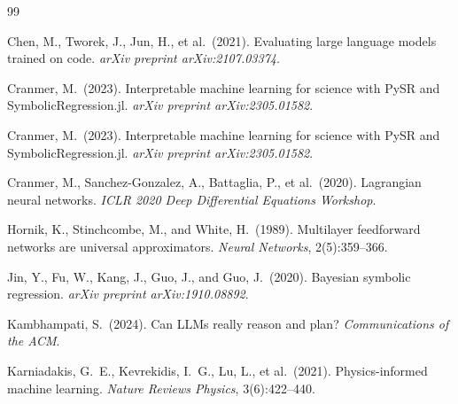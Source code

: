 \documentclass[twoside,11pt]{article}
\begin{document}

\begin{thebibliography}{99}

Chen, M., Tworek, J., Jun, H., et al.\ (2021).
Evaluating large language models trained on code.
\emph{arXiv preprint arXiv:2107.03374}.

Cranmer, M.\ (2023).
Interpretable machine learning for science with PySR and SymbolicRegression.jl.
\emph{arXiv preprint arXiv:2305.01582}.

Cranmer, M.\ (2023).
Interpretable machine learning for science with PySR and SymbolicRegression.jl.
\emph{arXiv preprint arXiv:2305.01582}.

Cranmer, M., Sanchez-Gonzalez, A., Battaglia, P., et al.\ (2020).
Lagrangian neural networks.
\emph{ICLR 2020 Deep Differential Equations Workshop}.

Hornik, K., Stinchcombe, M., and White, H.\ (1989).
Multilayer feedforward networks are universal approximators.
\emph{Neural Networks}, 2(5):359--366.

Jin, Y., Fu, W., Kang, J., Guo, J., and Guo, J.\ (2020).
Bayesian symbolic regression.
\emph{arXiv preprint arXiv:1910.08892}.

Kambhampati, S.\ (2024).
Can LLMs really reason and plan?
\emph{Communications of the ACM}.

Karniadakis, G.~E., Kevrekidis, I.~G., Lu, L., et al.\ (2021).
Physics-informed machine learning.
\emph{Nature Reviews Physics}, 3(6):422--440.


\end{thebibliography}
\end{document}
